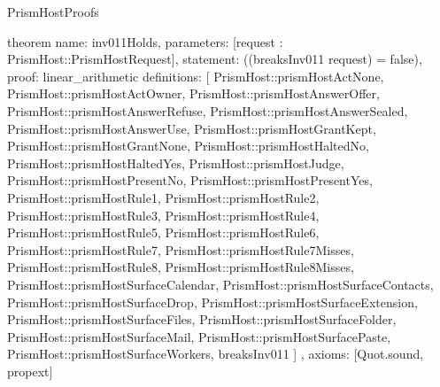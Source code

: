 \begin{lexlean}{PrismHostProofs}
\begin{semanticmodule}
theorem{
  name: inv011Holds,
  parameters: [request : PrismHost::PrismHostRequest],
  statement: ((breaksInv011 request) = false),
  proof: linear_arithmetic{
    definitions: [
      PrismHost::prismHostActNone,
      PrismHost::prismHostActOwner,
      PrismHost::prismHostAnswerOffer,
      PrismHost::prismHostAnswerRefuse,
      PrismHost::prismHostAnswerSealed,
      PrismHost::prismHostAnswerUse,
      PrismHost::prismHostGrantKept,
      PrismHost::prismHostGrantNone,
      PrismHost::prismHostHaltedNo,
      PrismHost::prismHostHaltedYes,
      PrismHost::prismHostJudge,
      PrismHost::prismHostPresentNo,
      PrismHost::prismHostPresentYes,
      PrismHost::prismHostRule1,
      PrismHost::prismHostRule2,
      PrismHost::prismHostRule3,
      PrismHost::prismHostRule4,
      PrismHost::prismHostRule5,
      PrismHost::prismHostRule6,
      PrismHost::prismHostRule7,
      PrismHost::prismHostRule7Misses,
      PrismHost::prismHostRule8,
      PrismHost::prismHostRule8Misses,
      PrismHost::prismHostSurfaceCalendar,
      PrismHost::prismHostSurfaceContacts,
      PrismHost::prismHostSurfaceDrop,
      PrismHost::prismHostSurfaceExtension,
      PrismHost::prismHostSurfaceFiles,
      PrismHost::prismHostSurfaceFolder,
      PrismHost::prismHostSurfaceMail,
      PrismHost::prismHostSurfacePaste,
      PrismHost::prismHostSurfaceWorkers,
      breaksInv011
    ]
  },
  axioms: [Quot.sound, propext]
}
\end{semanticmodule}
\end{lexlean}
